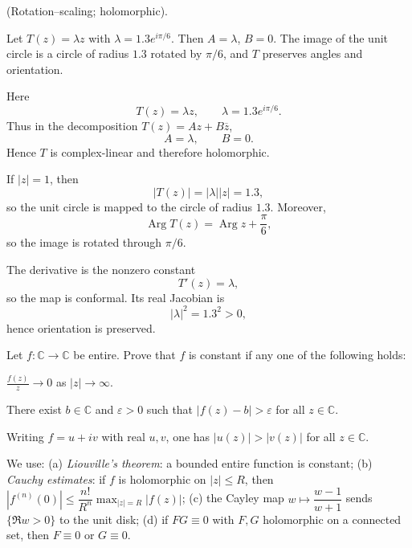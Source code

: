 \begin{problem}[CP-IV-0116]
\label{prob:cp-iv-0116}
(Rotation–scaling; holomorphic).

Let $T(z)=\lambda z$ with $\lambda=1.3 e^{i\pi/6}$. Then $A=\lambda$, $B=0$.
The image of the unit circle is a circle of radius $1.3$ rotated by $\pi/6$, and $T$ preserves angles and orientation.
\end{problem}

\begin{solution}
Here
\[
T(z)=\lambda z,
\qquad
\lambda=1.3e^{i\pi/6}.
\]
Thus in the decomposition \(T(z)=Az+B\overline z\),
\[
A=\lambda,\qquad B=0.
\]
Hence \(T\) is complex-linear and therefore holomorphic.

If \(|z|=1\), then
\[
|T(z)|=|\lambda||z|=1.3,
\]
so the unit circle is mapped to the circle of radius \(1.3\). Moreover,
\[
\operatorname{Arg}T(z)
=
\operatorname{Arg}z+\frac{\pi}{6},
\]
so the image is rotated through \(\pi/6\).

The derivative is the nonzero constant
\[
T'(z)=\lambda,
\]
so the map is conformal. Its real Jacobian is
\[
|\lambda|^2=1.3^2>0,
\]
hence orientation is preserved.
\end{solution}


\begin{problem}[CP-IV-0117]
\label{prob:cp-iv-0117}
Let $f:\mathbb C\to\mathbb C$ be entire. Prove that $f$ is constant if any one of the following holds:

	\par\noindent\textbullet\quad $\displaystyle \frac{f(z)}{z}\to 0$ as $|z|\to\infty$.
	\par\noindent\textbullet\quad There exist $b\in\mathbb C$ and $\varepsilon>0$ such that $|f(z)-b|>\varepsilon$ for all $z\in\mathbb C$.
	\par\noindent\textbullet\quad Writing $f=u+iv$ with real $u,v$, one has $|u(z)|>|v(z)|$ for all $z\in\mathbb C$.

We use: (a) \emph{Liouville’s theorem}: a bounded entire function is constant; (b) \emph{Cauchy estimates}:
if $f$ is holomorphic on $|z|\le R$, then $|f^{(n)}(0)|\le \dfrac{n!}{R^n}\max_{|z|=R}|f(z)|$;
(c) the Cayley map $w\mapsto \dfrac{w-1}{w+1}$ sends $\{\Re w>0\}$ to the unit disk;
(d) if $FG\equiv 0$ with $F,G$ holomorphic on a connected set, then $F\equiv 0$ or $G\equiv 0$.
\end{problem}


